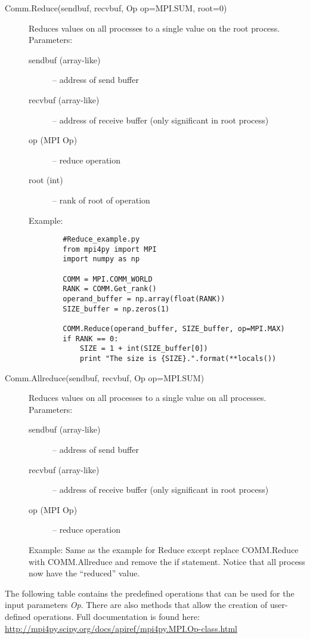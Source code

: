 \begin{description}
  \item[Comm.Reduce(sendbuf, recvbuf, Op op=MPI.SUM, root=0)]
    Reduces values on all processes to a single value on the root process.
    Parameters:
    \begin{description}
      \item[sendbuf (array-like)] – address of send buffer
      \item[recvbuf (array-like)] – address of receive buffer (only significant in root process)
      \item[op (MPI Op)] – reduce operation
      \item[root (int)] – rank of root of operation
    \end{description}
    Example:
      \begin{lstlisting}
        #Reduce_example.py
        from mpi4py import MPI
        import numpy as np

        COMM = MPI.COMM_WORLD
        RANK = COMM.Get_rank()
        operand_buffer = np.array(float(RANK))
        SIZE_buffer = np.zeros(1)

        COMM.Reduce(operand_buffer, SIZE_buffer, op=MPI.MAX)
        if RANK == 0:
            SIZE = 1 + int(SIZE_buffer[0])
            print "The size is {SIZE}.".format(**locals())
      \end{lstlisting}
  \item[Comm.Allreduce(sendbuf, recvbuf, Op op=MPI.SUM)]
    Reduces values on all processes to a single value on all processes.
    Parameters:
    \begin{description}
      \item[sendbuf (array-like)] – address of send buffer
      \item[recvbuf (array-like)] – address of receive buffer (only significant in root process)
      \item[op (MPI Op)] – reduce operation
    \end{description}
    Example:
      Same as the example for Reduce except replace COMM.Reduce with COMM.Allreduce and remove the if statement. Notice that all process now have the “reduced” value.
\end{description}

  The following table contains the predefined operations that can be used for the input parameters \emph{Op}. There are also methods that allow the creation of user-defined operations. Full documentation is found here: \href{http://mpi4py.scipy.org/docs/apiref/mpi4py.MPI.Op-class.html}{http://mpi4py.scipy.org/docs/apiref/mpi4py.MPI.Op-class.html}

